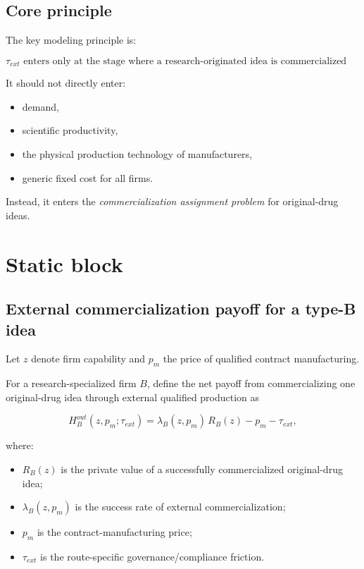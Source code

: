 \documentclass[12pt]{ctexart}
\begin{document}
\subsection{Core principle}

The key modeling principle is:

\[
\boxed{\tau_{ext}\text{ enters only at the stage where a research-originated idea is commercialized externally.}}
\]

It should not directly enter:
\begin{itemize}[leftmargin=2em]
    \item demand,
    \item scientific productivity,
    \item the physical production technology of manufacturers,
    \item generic fixed cost for all firms.
\end{itemize}

Instead, it enters the \emph{commercialization assignment problem} for original-drug ideas.

\section{Static block}

\subsection{External commercialization payoff for a type-B idea}

Let \(z\) denote firm capability and \(p_m\) the price of qualified contract manufacturing.

For a research-specialized firm \(B\), define the net payoff from commercializing one
original-drug idea through external qualified production as

\[
H_B^{out}(z,p_m;\tau_{ext})
=
\lambda_B(z,p_m)\,R_B(z)-p_m-\tau_{ext},
\]

where:
\begin{itemize}[leftmargin=2em]
    \item \(R_B(z)\) is the private value of a successfully commercialized original-drug idea;
    \item \(\lambda_B(z,p_m)\) is the success rate of external commercialization;
    \item \(p_m\) is the contract-manufacturing price;
    \item \(\tau_{ext}\) is the route-specific governance/compliance friction.
\end{itemize}
\end{document}
